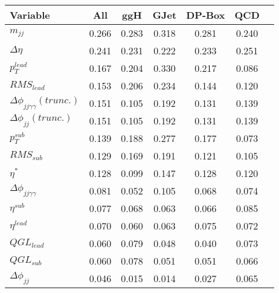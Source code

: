 \documentclass{article}
\begin{document}
\begin{center}
\begin{tabular}{| l || c | c | c | c | c | c |}
\hline
Variable & All & ggH & GJet & DP-Box & QCD \\ \hline
$m_{jj}$ & 0.266 & 0.283 & 0.318 & 0.281 & 0.240 \\ 
$\Delta\eta$ & 0.241 & 0.231 & 0.222 & 0.233 & 0.251 \\ 
$p_{T}^{lead}$ & 0.167 & 0.204 & 0.330 & 0.217 & 0.086 \\ 
$RMS_{lead}$ & 0.153 & 0.206 & 0.234 & 0.144 & 0.120 \\ 
$\Delta\phi_{jj\gamma\gamma}(trunc.)$ & 0.151 & 0.105 & 0.192 & 0.131 & 0.139 \\ 
$\Delta\phi_{jj}(trunc.)$ & 0.151 & 0.105 & 0.192 & 0.131 & 0.139 \\ 
$p_{T}^{sub}$ & 0.139 & 0.188 & 0.277 & 0.177 & 0.073 \\ 
$RMS_{sub}$ & 0.129 & 0.169 & 0.191 & 0.121 & 0.105 \\ 
$\eta^{*}$ & 0.128 & 0.099 & 0.147 & 0.128 & 0.120 \\ 
$\Delta\phi_{jj\gamma\gamma}$ & 0.081 & 0.052 & 0.105 & 0.068 & 0.074 \\ 
$\eta^{sub}$ & 0.077 & 0.068 & 0.063 & 0.066 & 0.085 \\ 
$\eta^{lead}$ & 0.070 & 0.060 & 0.063 & 0.075 & 0.072 \\ 
$QGL_{lead}$ & 0.060 & 0.079 & 0.048 & 0.040 & 0.073 \\ 
$QGL_{sub}$ & 0.060 & 0.078 & 0.051 & 0.051 & 0.066 \\ 
$\Delta\phi_{jj}$ & 0.046 & 0.015 & 0.014 & 0.027 & 0.065 \\ 
\hline
\end{tabular}
\end{center}
\end{document}
